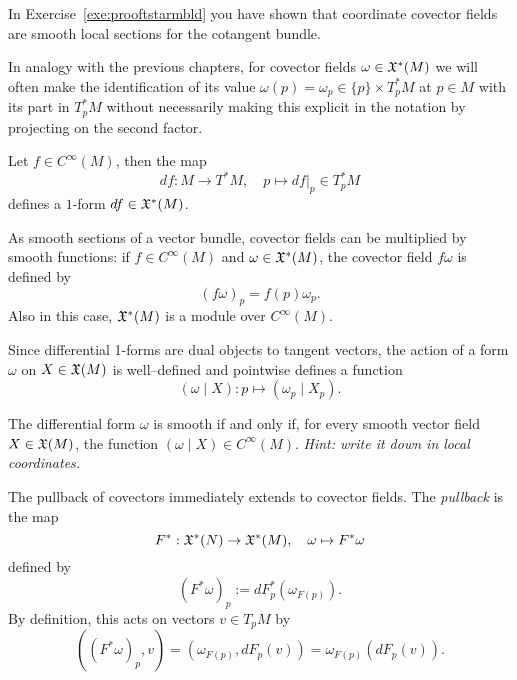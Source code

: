 \begin{remark}
	In Exercise~\ref{exe:prooftstarmbld} you have shown that coordinate covector fields are smooth local sections for the cotangent bundle.
\end{remark}

In analogy with the previous chapters, for covector fields $\omega\in\mathfrak{X}^*(M)$ we will often make the identification of its value $\omega(p) = \omega_p \in \{p\}\times T^*_p M$ at $p\in M$ with its part in $T_p^*M$ without necessarily making this explicit in the notation by projecting on the second factor.

\begin{example}
	Let $f\in C^\infty(M)$, then the map
	\begin{equation}
		df : M \to T^*M, \quad p \mapsto df|_p \in T^*_p M
	\end{equation}
	defines a $1$-form $df\in\mathfrak{X}^*(M)$.
\end{example}

As smooth sections of a vector bundle, covector fields can be multiplied by smooth functions: if $f\in C^\infty(M)$ and $\omega\in\mathfrak{X}^*(M)$, the covector field $f\omega$ is defined by
\begin{equation}
	(f\omega)_p = f(p)\omega_p.
\end{equation}
Also in this case, $\mathfrak{X}^*(M)$ is a module over $C^\infty(M)$.

Since differential 1-forms are dual objects to tangent vectors, the action of a form $\omega$ on $X\in\mathfrak{X}(M)$ is well--defined and pointwise defines a function
\begin{equation}
	(\omega \mid X) : p \mapsto (\omega_p \mid X_p).
\end{equation}

\begin{exercise}
	The differential form $\omega$ is smooth if and only if, for every smooth vector field $X\in\mathfrak{X}(M)$, the function $(\omega \mid X)\in C^\infty(M)$.
	\textit{\small Hint: write it down in local coordinates.}
\end{exercise}

\begin{definition}\label{def:pullback1f}
	The pullback of covectors immediately extends to covector fields.
	The \emph{pullback} is the map
	\begin{equation}
		F^*: \mathfrak{X}^*(N) \to \mathfrak{X}^*(M), \quad \omega \mapsto F^* \omega
	\end{equation}
	defined by
	\begin{equation}
		(F^*\omega)_p := dF_p^*(\omega_{F(p)}).
	\end{equation}
	By definition, this acts on vectors $v\in T_p M$ by
	\begin{equation}
		((F^*\omega)_p, v) = (\omega_{F(p)}, dF_p(v)) = \omega_{F(p)}(dF_p(v)).
	\end{equation}
\end{definition}

